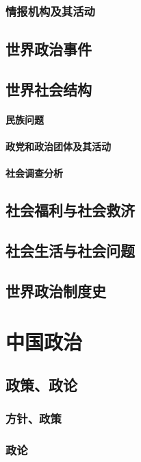 \documentclass[UTF8]{../RepresentationUniverse}
\begin{document}
    \subsection{情报机构及其活动}


\section{世界政治事件}
\section{世界社会结构}
    \subsubsection{民族问题}
    \subsubsection{政党和政治团体及其活动}
    \subsubsection{社会调查分析}

\section{社会福利与社会救济}
\section{社会生活与社会问题}
\section{世界政治制度史}










\chapter{中国政治}
\section{政策、政论}
    \subsection{方针、政策}
    \subsection{政论}
\end{document}
